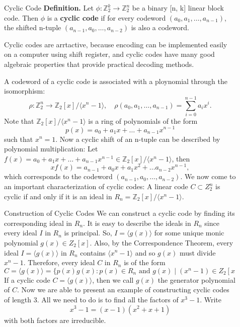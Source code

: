 \documentclass[final]{beamer}
\newcommand{\Z}{\mathbb{Z}}
\newlength{\sepwidth}
\newlength{\colwidth}
\newcommand{\separatorcolumn}{\begin{column}{\sepwidth}\end{column}}
\begin{document}
\begin{frame}[t]
\begin{columns}[t]
\begin{column}{\colwidth}
\end{column}

\separatorcolumn

\begin{column}{\colwidth}

  \begin{block}{Cyclic Code}
    \textbf{Definition.} Let $\phi: \Z_2^k \to \Z_2^n$ be a binary [n, k] linear block code.
    Then $\phi$ is a \textbf{cyclic code} if for every codeword $(a_0, a_1, \dots, a_{n-1})$,
    the shifted n-tuple $(a_{n-1}, a_0, \dots, a_{n-2})$ is also a codeword.

    Cyclic codes are arrtactive, because encoding can be implemented easily on a computer
    using shift register, and cyclic codes have many good algebraic properties that provide
    practical decoding methods. 

    A codeword of a cyclic code is associated with a ploynomial through the isomorphism:
    $$\rho : \Z_2^n \to \Z_2[x]/\langle x^n - 1 \rangle, \quad \rho(a_0, a_1, \dots, a_{n-1}) = \sum_{i = 0}^{n-1} a_ix^i.$$
    Note that $\Z_2[x]/\langle x^n - 1 \rangle$ is a ring of polynomials of the form 
    $$p(x) = a_0 + a_1x + \dots + a_{n-1}x^{n-1}$$ such that $x^n = 1$. Now a cyclic shift
    of an n-tuple can be described by polynomial multiplication: Let $f(x) = a_0 + a_1x + \dots + a_{n-1}x^{n-1} \in \Z_2[x]/\langle x^n - 1 \rangle$,
    then $$xf(x) = a_{n-1} + a_0x + a_1x^2 + \dots a_{n-2}x^{n-1},$$ which corresponds to the codeword $(a_{n-1}, a_0, \dots, a_{n-2})$. 
    We now come to an important characterization of cyclic codes: A linear code $C \subset Z_2^n$
    is cyclic if and only if it is an ideal in $R_n = \Z_2[x]/\langle x^n - 1 \rangle$. 

    \begin{alertblock}{Construction of Cyclic Codes}
      We can construct a cyclic code by finding its corresponding ideal in $R_n$. It is easy to describe the ideals in $R_n$ since every ideal $I$ in $R_n$ is principal.
      So, $I = \langle g(x) \rangle$ for some unique monic polynomial $g(x) \in Z_2[x]$. Also, by the Correspondence Theorem,
      every ideal $I = \langle g(x) \rangle$ in $R_n$ contains $\langle x^n - 1 \rangle$ and so $g(x)$ must divide $x^n-1$.
      Therefore, every ideal $C$ in $R_n$ is of the form $$C = \langle g(x) \rangle = \{p(x)g(x) : p(x) \in R_n \text{ and } g(x) \mid (x^n-1) \in Z_2[x]\}.$$ 
      If a cyclic code $C = \langle g(x) \rangle$, then we call $g(x)$ the generator polynomial of $C$.
      Now we are able to present an example of constructing cyclic codes of length 3. 
      All we need to do is to find all the factors of $x^3-1$. Write $$x^3-1 = (x-1)(x^2+x+1)$$ with both factors are irreducible.
    \end{alertblock}


\end{block}
\end{column}
\end{columns}
\end{frame}
\end{document}
